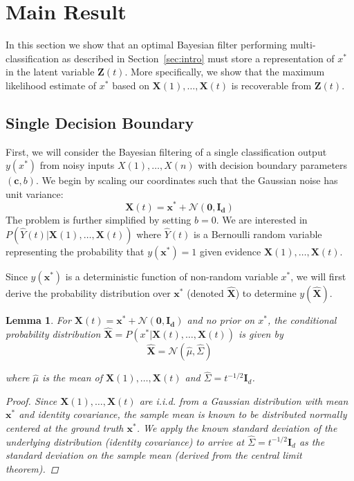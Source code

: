 \documentclass[12pt]{article}
\newtheorem{lemma}{Lemma}
\begin{document}
\section{Main Result}

In this section we show that an optimal Bayesian filter performing multi-classification as described in Section~\ref{sec:intro} must store a representation of $x^*$ in the latent variable $\mathbf Z(t)$. 
More specifically, we show that the maximum likelihood estimate of $x^*$ based on $\mathbf X(1), \dots, \mathbf X(t)$ is recoverable from $\mathbf Z(t)$.



\subsection{Single Decision Boundary}
\label{sec:single_boundary}

First, we will consider the Bayesian filtering of a single classification output $y(x^*)$ from noisy inputs $X(1), \dots, X(n)$ with decision boundary parameters $(\mathbf c, b)$. 
We begin by scaling our coordinates such that the Gaussian noise has unit variance:
\begin{equation}
	\mathbf X(t) = \mathbf x^* + \mathcal N(\mathbf{0, I_d})
\end{equation}
The problem is further simplified by setting $b = 0$. 
We are interested in $P(\hat Y(t) | \mathbf X(1), \dots, \mathbf X(t))$ where $\hat Y(t)$ is a Bernoulli random variable representing the probability that $y(\mathbf x^*) = 1$ given evidence $\mathbf X(1), \dots, \mathbf X(t)$. 

Since $y(\mathbf x^*)$ is a deterministic function of non-random variable $x^*$, we will first derive the probability distribution over $\mathbf x^*$ (denoted $\hat{\mathbf X}$) to determine $y(\hat{\mathbf X})$. 

\begin{lemma}
	\label{lemma:x_star_estimate}
	For $\mathbf X(t) = \mathbf x^* + \mathcal N(\mathbf{0, I_d})$ and no prior on $x^*$, the conditional probability distribution $\hat{\mathbf X} = P(x^* | \mathbf X(t), \dots, \mathbf X(t))$ is given by 
	\begin{equation}
		\hat{\mathbf X} = \mathcal N(\hat \mu, \hat \Sigma)
	\end{equation}

	where $\hat \mu$ is the mean of $\mathbf X(1), \dots, \mathbf X(t)$ and $\hat \Sigma = t^{-1/2} \mathbf I_d$. 

	\begin{proof}
		Since $\mathbf X(1), \dots, \mathbf X(t)$ are i.i.d. from a Gaussian distribution with mean $\mathbf x^*$ and identity covariance, the sample mean is known to be distributed normally centered at the ground truth $\mathbf x^*$. 
		We apply the known standard deviation of the underlying distribution (identity covariance) to arrive at $\hat \Sigma = t^{-1/2} \mathbf I_d$ as the standard deviation on the sample mean (derived from the central limit theorem). 
	\end{proof}
\end{lemma}
\end{document}
